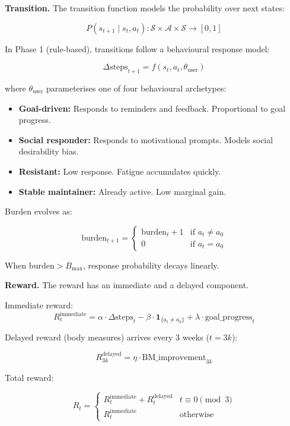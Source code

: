 \documentclass[11pt,a4paper]{article}
\begin{document}
\textbf{Transition.} The transition function models the probability over next states:

\[
P(s_{t+1} \mid s_t, a_t): \mathcal{S} \times \mathcal{A} \times \mathcal{S}
\rightarrow [0,1]
\]

In Phase 1 (rule-based), transitions follow a behavioural response model:

\[
\Delta \text{steps}_{t+1} = f(s_t, a_t, \theta_{\text{user}})
\]

where $\theta_{\text{user}}$ parameterises one of four behavioural archetypes:

\begin{itemize}[noitemsep]
    \item \textbf{Goal-driven:} Responds to reminders and feedback.
    Proportional to goal progress.
    \item \textbf{Social responder:} Responds to motivational prompts.
    Models social desirability bias.
    \item \textbf{Resistant:} Low response. Fatigue accumulates quickly.
    \item \textbf{Stable maintainer:} Already active. Low marginal gain.
\end{itemize}

Burden evolves as:

\[
\text{burden}_{t+1} =
\begin{cases}
\text{burden}_t + 1 & \text{if } a_t \neq a_0 \\
0 & \text{if } a_t = a_0
\end{cases}
\]

When $\text{burden} > B_{\max}$, response probability decays linearly.

\textbf{Reward.} The reward has an immediate and a delayed component.

Immediate reward:
\[
R_t^{\text{immediate}} = \alpha \cdot \Delta\text{steps}_t
- \beta \cdot \mathbf{1}_{\{a_t \neq a_0\}}
+ \lambda \cdot \text{goal\_progress}_t
\]

Delayed reward (body measures) arrives every 3 weeks ($t = 3k$):

\[
R_{3k}^{\text{delayed}} = \eta \cdot \text{BM\_improvement}_{3k}
\]

Total reward:

\[
R_t =
\begin{cases}
R_t^{\text{immediate}} + R_t^{\text{delayed}} & t \equiv 0 \pmod{3} \\
R_t^{\text{immediate}} & \text{otherwise}
\end{cases}
\]
\end{document}

